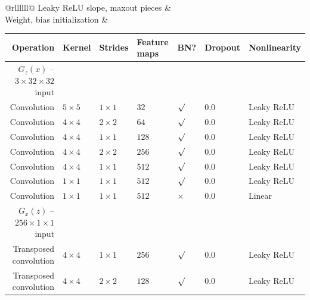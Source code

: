 \documentclass{article}
\begin{document}
{\begin{table}[h]
\begin{tabular}{@{}rllllll@{}}
Leaky ReLU slope, maxout pieces       &                                                 \\
Weight, bias initialization  &  \\ \bottomrule
\end{tabular}
\vspace{0.2cm}
\caption{\label{tab:cifar10_description} CIFAR10 model hyperparameters. Maxout
    layers \citep{goodfellow2013maxout} are used in the discriminator.}
\end{table}

\begin{table}[h]
\centering
\begin{tabular}{@{}rllllll@{}} \toprule
Operation              & Kernel       & Strides      & Feature maps & BN?          & Dropout & Nonlinearity \\ \midrule
$G_z(x)$ -- $3 \times 32 \times 32$ input                                                                 \\
Convolution            & $5 \times 5$ & $1 \times 1$ & $32$         & $\surd$      & 0.0     & Leaky ReLU \\
Convolution            & $4 \times 4$ & $2 \times 2$ & $64$         & $\surd$      & 0.0     & Leaky ReLU \\
Convolution            & $4 \times 4$ & $1 \times 1$ & $128$        & $\surd$      & 0.0     & Leaky ReLU \\
Convolution            & $4 \times 4$ & $2 \times 2$ & $256$        & $\surd$      & 0.0     & Leaky ReLU \\
Convolution            & $4 \times 4$ & $1 \times 1$ & $512$        & $\surd$      & 0.0     & Leaky ReLU \\
Convolution            & $1 \times 1$ & $1 \times 1$ & $512$        & $\surd$      & 0.0     & Leaky ReLU \\
Convolution            & $1 \times 1$ & $1 \times 1$ & $512$        & $\times$     & 0.0     & Linear     \\
$G_x(z)$ -- $256 \times 1 \times 1$ input                                                                 \\
Transposed convolution & $4 \times 4$ & $1 \times 1$ & $256$        & $\surd$      & 0.0     & Leaky ReLU \\
Transposed convolution & $4 \times 4$ & $2 \times 2$ & $128$        & $\surd$      & 0.0     & Leaky ReLU \\

\end{tabular}
\end{table}}
\end{document}
